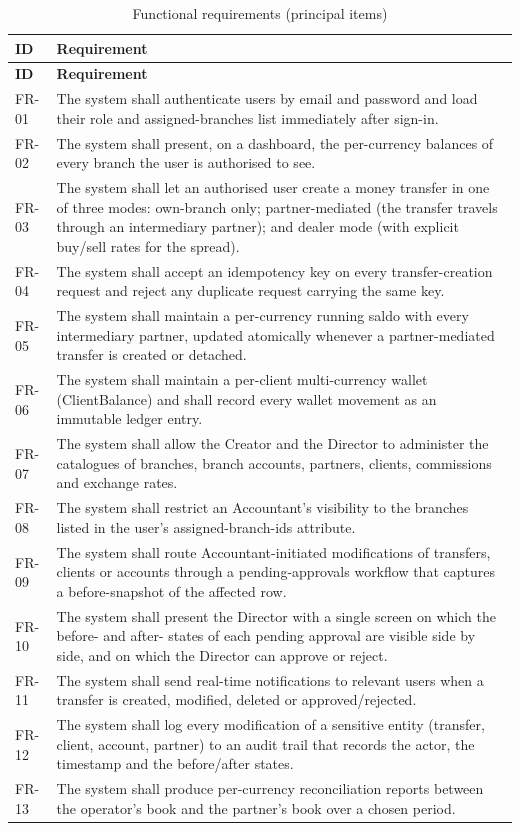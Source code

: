 {\singlespacing
\begin{longtable}{p{1.3cm}p{12.5cm}}
  \caption{Functional requirements (principal items)}
  \label{tab:func}\\
  \toprule
  \textbf{ID}  & \textbf{Requirement}\\
  \midrule
  \endfirsthead
  \toprule
  \textbf{ID}  & \textbf{Requirement}\\
  \midrule
  \endhead
  \bottomrule
  \endfoot
  FR-01 & The system shall authenticate users by email and password and load their role and assigned-branches list immediately after sign-in.\\
  FR-02 & The system shall present, on a dashboard, the per-currency balances of every branch the user is authorised to see.\\
  FR-03 & The system shall let an authorised user create a money transfer in one of three modes: own-branch only; partner-mediated (the transfer travels through an intermediary partner); and dealer mode (with explicit buy/sell rates for the spread).\\
  FR-04 & The system shall accept an idempotency key on every transfer-creation request and reject any duplicate request carrying the same key.\\
  FR-05 & The system shall maintain a per-currency running saldo with every intermediary partner, updated atomically whenever a partner-mediated transfer is created or detached.\\
  FR-06 & The system shall maintain a per-client multi-currency wallet (ClientBalance) and shall record every wallet movement as an immutable ledger entry.\\
  FR-07 & The system shall allow the Creator and the Director to administer the catalogues of branches, branch accounts, partners, clients, commissions and exchange rates.\\
  FR-08 & The system shall restrict an Accountant's visibility to the branches listed in the user's assigned-branch-ids attribute.\\
  FR-09 & The system shall route Accountant-initiated modifications of transfers, clients or accounts through a pending-approvals workflow that captures a before-snapshot of the affected row.\\
  FR-10 & The system shall present the Director with a single screen on which the before- and after- states of each pending approval are visible side by side, and on which the Director can approve or reject.\\
  FR-11 & The system shall send real-time notifications to relevant users when a transfer is created, modified, deleted or approved/rejected.\\
  FR-12 & The system shall log every modification of a sensitive entity (transfer, client, account, partner) to an audit trail that records the actor, the timestamp and the before/after states.\\
  FR-13 & The system shall produce per-currency reconciliation reports between the operator's book and the partner's book over a chosen period.\\
\end{longtable}
}

